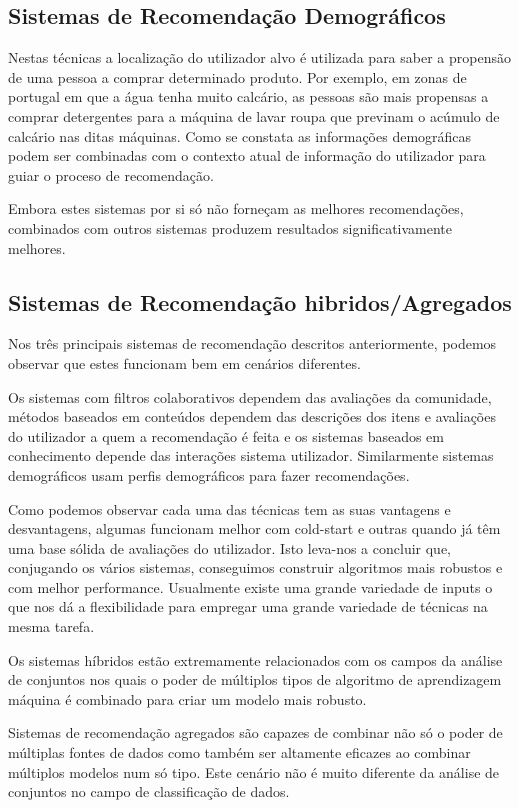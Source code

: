 \hfill
\subsection{Sistemas de Recomendação Demográficos}\hfill


 \par Nestas técnicas a localização do utilizador alvo é utilizada para saber a propensão de uma pessoa a comprar determinado produto. Por exemplo, em zonas de portugal em que a água tenha muito calcário, as pessoas são mais propensas a comprar detergentes para a máquina de lavar roupa que previnam o acúmulo de calcário nas ditas máquinas. Como se constata as informações demográficas podem ser combinadas com o contexto atual de informação do utilizador para guiar o proceso de recomendação.
 \par Embora estes sistemas por si só não forneçam as melhores recomendações, combinados com outros sistemas produzem resultados significativamente melhores.
\hfill
\subsection{Sistemas de Recomendação hibridos/Agregados}
\hfill
 \par Nos três principais sistemas de recomendação descritos anteriormente, podemos observar que estes funcionam bem em cenários diferentes. 
 \par Os sistemas com filtros colaborativos dependem das avaliações da comunidade, métodos baseados em conteúdos dependem das descrições dos itens e avaliações do utilizador a quem a recomendação é feita e os sistemas baseados em conhecimento depende das interações sistema utilizador. Similarmente sistemas demográficos usam perfis demográficos para fazer recomendações.
 \par Como podemos observar cada uma das técnicas tem as suas vantagens e desvantagens, algumas funcionam melhor com cold-start e outras quando já têm uma base sólida de avaliações do utilizador. Isto leva-nos a concluir que, conjugando os vários sistemas, conseguimos construir algoritmos mais robustos e com melhor performance. Usualmente existe uma grande variedade de inputs o que nos dá a flexibilidade para empregar uma grande variedade de técnicas na mesma tarefa.
 \par Os sistemas híbridos estão extremamente relacionados com os campos da análise de conjuntos nos quais o poder de múltiplos tipos de algoritmo de aprendizagem máquina é combinado para criar um modelo mais robusto.
 \par Sistemas de recomendação agregados são capazes de combinar não só o poder de múltiplas fontes de dados como também ser altamente eficazes ao combinar múltiplos modelos num só tipo. Este cenário não é muito diferente da análise de conjuntos no campo de classificação de dados.

